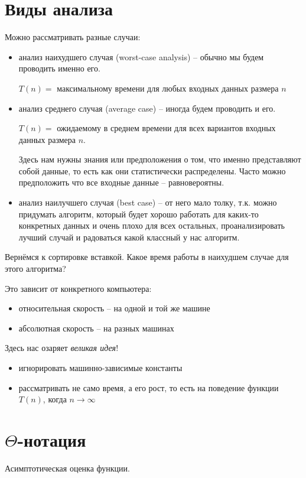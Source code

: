 \documentclass[11pt]{article}
\begin{document}
\section{Виды анализа}
Можно рассматривать разные случаи:

\begin{itemize}
\item анализ наихудшего случая (worst-case analysis) -- обычно мы будем
  проводить именно его.

  $T(n) = $ максимальному времени для любых входных данных размера $n$

\item анализ среднего случая (average case) -- иногда будем проводить и его.

  $T(n) = $ ожидаемому в среднем времени для всех вариантов входных данных
  размера $n$.

  Здесь нам нужны знания или предположения о том, что именно представляют собой
  данные, то есть как они статистически распределены. Часто можно предположить
  что все входные данные -- равновероятны.

\item анализ наилучшего случая (best case) -- от него мало толку, т.к. можно
  придумать алгоритм, который будет хорошо работать для каких-то конкретных
  данных и очень плохо для всех остальных, проанализировать лучший случай и
  радоваться какой классный у нас алгоритм.
\end{itemize}

Вернёмся к сортировке вставкой. Какое время работы в наихудшем случае для этого
алгоритма?

Это зависит от конкретного компьютера:
\begin{itemize}
\item относительная скорость -- на одной и той же машине
\item абсолютная скорость -- на разных машинах
\end{itemize}

Здесь нас озаряет \emph{великая идея}!
\begin{itemize}
\item игнорировать машинно-зависимые константы
\item рассматривать не само время, а его рост, то есть на поведение функции
  $T(n)$, когда $n \rightarrow \infty$
\end{itemize}

\section{$\Theta$-нотация}
Асимптотическая оценка функции.
\end{document}
